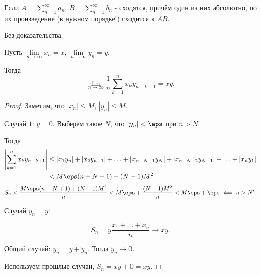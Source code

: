 \begin{theorem} \thmslashn

    Если $A = \sum\limits_{n=1}^{\infty} a_{n}$, $B = \sum\limits_{n=1}^{\infty} b_{n}$ - сходятся, причём один из них абсолютно, по их произведение (в нужном порядке!) сходится к $AB$.

    Без доказательства.
\end{theorem}
\begin{lemma} \thmslashn

    Пусть $\lim\limits_{n \to \infty} x_{n} = x$, $\lim\limits_{n \to \infty} y_{n} = y$.

    Тогда
    \[ \lim\limits_{n \to \infty} \frac{1}{n} \sum\limits_{k=1}^{n} x_{k}y_{n-k+1} = xy .\]
    \begin{proof} \thmslashn
    
        Заметим, что $|x_{n}| \le M$, $|y_{n}| \le M$.

        Случай $1$: $y = 0$. Выберем такое $N$, что $|y_{n}| < \eps$ при $n > N$.

        Тогда 
        \begin{equation*}
            \begin{split}
                \left| \sum\limits_{k=1}^{n} x_{k}y_{n-k+1}\right|
                &\le |x_1y_{n}| + |x_2y_{n-1}| + \ldots + |x_{n-N+1}y_{N}| + |x_{n-N+2}y_{N-1}| + \ldots + |x_{n}y_1|\\
                &< M\eps(n-N+1) + (N-1)M^2
            \end{split}
        \end{equation*}
        \[ S_{n} < \frac{M\eps(n-N+1) + (N-1)M^2}{n} < M\eps + \frac{(N-1)M^2}{n} < M \eps + \eps \impliedby n > N'.\]

        Случай $y_{n}=y$:

        \[ S_{n} = y \frac{x_1+\ldots + x_{n}}{n} \to xy .\]

        Общий случай: $y_{n} = y + \tilde{y}_{n}$. Тогда $\tilde{y}_{n} \to 0$.

        Используем прошлые случаи, $S_{n} = xy + 0 = xy$.
    \end{proof}
\end{lemma}
